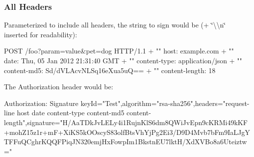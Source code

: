 \subsubsection*{All Headers}

Parameterized to include all headers, the string to sign would be ({\ttfamily + \char`\"{}\textbackslash{}\textbackslash{}n\char`\"{}} inserted for readability)\+: \begin{DoxyVerb}POST /foo?param=value&pet=dog HTTP/1.1 + "\n"
host: example.com + "\n"
date: Thu, 05 Jan 2012 21:31:40 GMT + "\n"
content-type: application/json + "\n"
content-md5: Sd/dVLAcvNLSq16eXua5uQ== + "\n"
content-length: 18
\end{DoxyVerb}


The Authorization header would be\+: \begin{DoxyVerb}Authorization: Signature keyId="Test",algorithm="rsa-sha256",headers="request-line host date content-type content-md5 content-length",signature="H/AaTDkJvLELy4i1RujnKlS6dm8QWiJvEpn9cKRMi49kKF+mohZ15z1r+mF+XiKS5kOOscyS83olfBtsVhYjPg2Ei3/D9D4Mvb7bFm9IaLJgYTFFuQCghrKQQFPiqJN320emjHxFowpIm1BkstnEU7lktH/XdXVBo8a6Uteiztw="\end{DoxyVerb}
 